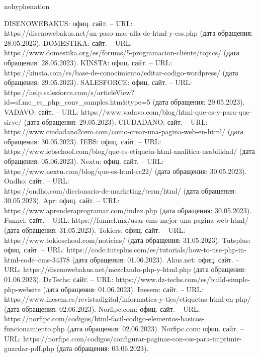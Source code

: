 \begin{hyphenrules}{nohyphenation}
\begin{thebibliography}{9}
     DISENOWEBAKUS: офиц. сайт. – URL: \\https://disenowebakus.net/un-paso-mas-alla-de-html-y-css.php (дата обращения: 28.05.2023).
     DOMESTIKA: сайт. – URL: https://www.domestika.org/es/forums/5-programacion-cliente/topics/ (дата обращения: 28.05.2023).
     KINSTA: офиц. сайт. – URL: https://kinsta.com/es/base-de-conocimiento/editar-codigo-wordpress/ (дата обращения: 29.05.2023).
     SALESFORCE: офиц. сайт. – URL: \\https://help.salesforce.com/s/articleView?id=sf.mc\_es\_php\_conv\_samples.htm\&type=5 (дата обращения: 29.05.2023).
     VADAVO: сайт. – URL: https://www.vadavo.com/blog/html-que-es-y-para-que-sirve/ (дата обращения: 29.05.2023).
     CIUDADANO: сайт. – URL: https://www.ciudadano2cero.com/como-crear-una-pagina-web-en-html/ (дата обращения: 30.05.2023).
     IEBS: офиц. сайт. – URL: https://www.iebschool.com/blog/que-es-etiqueta-html-analitica-usabilidad/ (дата обращения: 05.06.2023).
     Nextu: офиц. сайт. – URL: https://www.nextu.com/blog/que-es-html-rc22/ (дата обращения: 30.05.2023).
     Ondho: сайт. – URL: \\https://ondho.com/diccionario-de-marketing/term/html/ (дата обращения: 30.05.2023).
     Apr: офиц. сайт. – URL: https://www.aprenderaprogramar.com/index.php (дата обращения: 30.05.2023).
     Funnel: сайт. – URL: https://funnel.mx/usar-cms-mejor-una-pagina-web-html/ (дата обращения: 31.05.2023).
     Tokiers: офиц. сайт. – URL: https://www.tokioschool.com/noticias/ (дата обращения: 31.05.2023).
     Tutsplus: офиц. сайт. – URL: https://code.tutsplus.com/es/tutorials/how-to-use-php-in-html-code--cms-34378 (дата обращения: 01.06.2023).
     Akus.net: офиц. сайт. – URL: https://disenowebakus.net/mezclando-php-y-html.php (дата обращения: 01.06.2023).
     DzTechs: сайт. – URL: https://www.dz-techs.com/es/build-simple-php-website (дата обращения: 01.06.2023).
     Inesem: сайт. – URL: https://www.inesem.es/revistadigital/informatica-y-tics/etiquetas-html-en-php/ (дата обращения: 02.06.2023).
     Norfipc.com: офиц. сайт. – URL: \\https://norfipc.com/codigos/html-facil-codigo-elementos-basicos-funcionamiento.php (дата обращения: 02.06.2023).
     Norfipc.com: офиц. сайт. – URL: https://norfipc.com/codigos/configurar-paginas-con-css-para-imprimir-guardar-pdf.php (дата обращения: 03.06.2023).

\end{thebibliography}
\end{hyphenrules}
